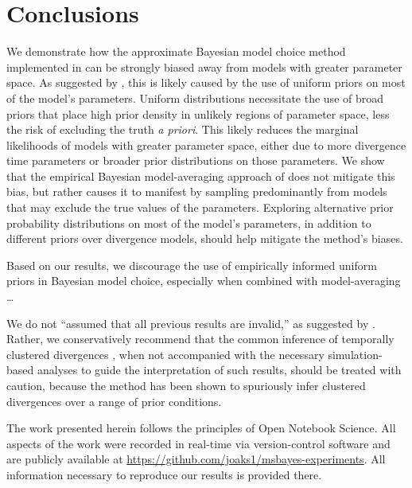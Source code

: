 \section*{Conclusions}
We demonstrate how the approximate Bayesian model choice method implemented in
\msb can be strongly biased away from models with greater parameter space.
As suggested by \citet{Oaks2012}, this is likely caused by the use of uniform
priors on most of the model's parameters.
Uniform distributions necessitate the use of broad priors that place high prior
density in unlikely regions of parameter space, less the risk of excluding the
truth \emph{a priori}.
This likely reduces the marginal likelihoods of models with greater parameter
space, either due to more divergence time parameters or broader prior
distributions on those parameters.
We show that the empirical Bayesian model-averaging approach of
\citet{Hickerson2013} does not mitigate this bias, but rather causes it to
manifest by sampling predominantly from models that may exclude the true values
of the parameters.
Exploring alternative prior probability distributions on most of the model's
parameters, in addition to different priors over divergence models, should
help mitigate the method's biases.

Based on our results, we discourage the use of empirically informed uniform
priors in Bayesian model choice, especially when combined with model-averaging
\ldots

We do not ``assumed that all previous \msb results are invalid,'' as suggested
by \citet{Hickerson2013}.
Rather, we conservatively recommend that the common inference of temporally
clustered divergences \citep{Barber2010, Bell2012, Carnaval2009, Chan2011,
Daza2010, Hickerson2006, Huang2011, Lawson2010, Leache2007, Plouviez2009,
Stone2012, Voje2009}, when not accompanied with the necessary simulation-based
analyses to guide the interpretation of such results, should be treated with
caution, because the method has been shown to spuriously infer clustered
divergences over a range of prior conditions.

The work presented herein follows the principles of Open Notebook Science.
All aspects of the work were recorded in real-time via version-control
software and are publicly available at
\href{https://github.com/joaks1/msbayes-experiments}{https://github.com/joaks1/msbayes-experiments}.
All information necessary to reproduce our results is provided there.

